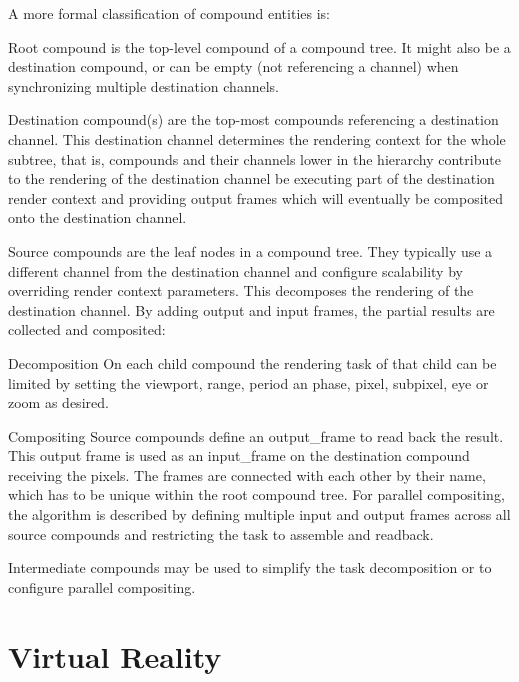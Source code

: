 A more formal classification of compound entities is:

\begin{compactdesc}
 \item [Root compound] is the top-level compound of a compound tree. It might
 also be a destination compound, or can be empty (not referencing a channel)
 when synchronizing multiple destination channels.
 \item [Destination compound(s)] are the top-most compounds referencing a
 destination channel. This destination channel determines the rendering context
 for the whole subtree, that is, compounds and their channels lower in the
 hierarchy contribute to the rendering of the destination channel be executing
 part of the destination render context and providing output frames which will
 eventually be composited onto the destination channel.
 \item [Source compounds] are the leaf nodes in a compound tree. They typically
 use a different channel from the destination channel and configure scalability
 by overriding render context parameters. This decomposes the rendering of the
 destination channel. By adding output and input frames, the partial results are
 collected and composited:
 \begin{compactdesc}
  \item[Decomposition] On each child compound the rendering task of that
  child can be limited by setting the \textsf{viewport}, \textsf{range},
  \textsf{period} an  \textsf{phase}, \textsf{pixel}, \textsf{subpixel},
  \textsf{eye} or \textsf{zoom} as desired.

  \item[Compositing] Source compounds define an \textsf{output\_frame} to read
  back the result. This output frame is used as an \textsf{input\_frame} on the
  destination compound receiving the pixels. The frames are connected with each
  other by their name, which has to be unique within the root compound tree.
  For parallel compositing, the algorithm is described by defining multiple
  input and output frames across all source compounds and restricting the task
  to assemble and readback.

 \end{compactdesc}
 \item[Intermediate compounds] may be used to simplify the task decomposition or
 to configure parallel compositing.
\end{compactdesc}

\section{Virtual Reality}

